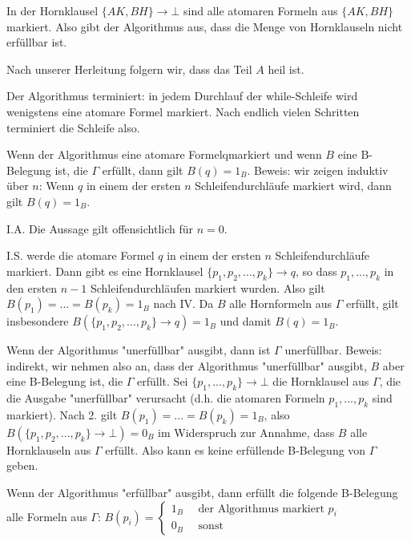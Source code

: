 \documentclass[a4paper]{article}
\begin{document}
\begin{multicols}{3}
  In der Hornklausel $\{AK,BH\}\rightarrow\bot$ sind alle atomaren Formeln aus $\{AK,BH\}$ markiert. Also gibt der Algorithmus aus, dass die Menge von Hornklauseln nicht erfüllbar ist.

  Nach unserer Herleitung folgern wir, dass das Teil $A$ heil ist.

  \begin{enumerate*}
    \item Der Algorithmus terminiert:
    in jedem Durchlauf der while-Schleife wird wenigstens eine atomare Formel markiert. Nach endlich vielen Schritten terminiert die Schleife also.
    \item Wenn der Algorithmus eine atomare Formelqmarkiert und wenn $B$ eine B-Belegung ist, die $\Gamma$ erfüllt, dann gilt $B(q) = 1_B$.
    Beweis: wir zeigen induktiv über $n$: Wenn $q$ in einem der ersten $n$ Schleifendurchläufe markiert wird, dann gilt $B(q) = 1_B$.
    \begin{itemize*}
      \item I.A. Die Aussage gilt offensichtlich für $n=0$.
      \item I.S. werde die atomare Formel $q$ in einem der ersten $n$ Schleifendurchläufe markiert. Dann gibt es eine Hornklausel $\{p_1,p_2 ,... ,p_k\}\rightarrow q$, so dass $p_1 ,... ,p_k$ in den ersten $n-1$ Schleifendurchläufen markiert wurden. Also gilt $B(p_1)=...=B(p_k) = 1_B$ nach IV.
      Da $B$ alle Hornformeln aus $\Gamma$ erfüllt, gilt insbesondere $B(\{p_1 ,p_2 ,... ,p_k\}\rightarrow q) = 1_B$ und damit $B(q) = 1_B$.
    \end{itemize*}
    \item Wenn der Algorithmus "unerfüllbar" ausgibt, dann ist $\Gamma$ unerfüllbar.
    Beweis: indirekt, wir nehmen also an, dass der Algorithmus "unerfüllbar" ausgibt, $B$ aber eine B-Belegung ist, die $\Gamma$ erfüllt.
    Sei $\{p_1 ,... ,p_k\}\rightarrow\bot$ die Hornklausel aus $\Gamma$, die die Ausgabe "unerfüllbar" verursacht (d.h. die atomaren Formeln $p_1 ,... ,p_k$ sind markiert).
    Nach 2. gilt $B(p_1) =...=B(p_k) = 1_B$, also $B(\{p_1 ,p_2 ,... ,p_k\}\rightarrow\bot) = 0_B$ im Widerspruch zur Annahme, dass $B$ alle Hornklauseln aus $\Gamma$ erfüllt.
    Also kann es keine erfüllende B-Belegung von $\Gamma$ geben.
    \item Wenn der Algorithmus "erfüllbar" ausgibt, dann erfüllt die folgende B-Belegung alle Formeln aus $\Gamma$:
    $B(p_i)=\begin{cases} 1_B \quad\text{ der Algorithmus markiert } p_i \\ 0_B \quad\text{ sonst} \end{cases}$

\end{enumerate*}
\end{multicols}
\end{document}
